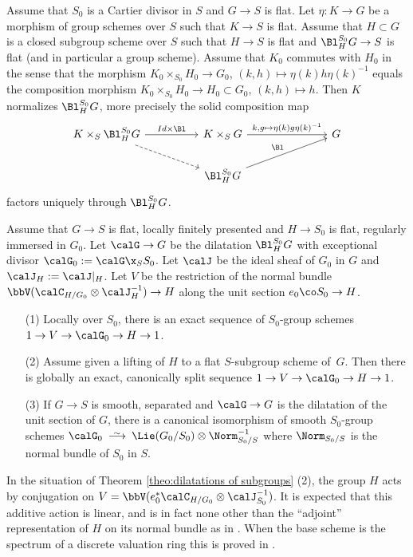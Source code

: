 \documentclass[10pt]{alggeom}
\theoremstyle{definition}
\numberwithin{equation}{section}
\newcommand*\isomto{%
  \renewcommand{\arraystretch}{0.1}
  \begin{array}[b]{c} {}_{\sim} \\ \longrightarrow \end{array}%
}
\begin{document}
\prop[\cite{Ma23d}]
Assume that $S_0$ is a Cartier divisor in $S$ and $G \to S$ is flat. Let $\eta : K\to G$ be a morphism of group schemes over $S$ such that $K \to S$ is flat. Assume that $H \subset G $ is a closed subgroup scheme over $S$ such that $H \to S$ is flat and $\Bl_H^{S_0} G \to S$ is flat (and in particular a group scheme). Assume that
 $K_0 $ commutes with $H_0$ in the sense that the morphism $K_0 \times _{S_0} H_0 \to G_0 $, $(k,h) \mapsto \eta(k)h\eta(k)^{-1} $ equals the composition morphism $K_0 \times _{S_0} H_0 \to H_0 \subset G_0$, $(k,h) \mapsto h$. Then $K$ normalizes $\Bl _H^{S_0} G$, more precisely the solid composition map \[
 \begin{tikzcd} K \times _S \Bl _{H}^{S_0} G \ar[rr, "Id \times \Bl "] \ar[rrd, dashrightarrow] & & K \times _S G \ar[rrr, "k {,} g \mapsto \eta(k)g\eta(k)^{-1} "] & & & G\\ &  &\Bl _H ^{S_0} G  \ar[rrru, "\Bl"]&  & \end{tikzcd} \]
 factors uniquely through $\Bl _H^{S_0} G $.
 \xprop
 

 
  \label{theo:dilatations of subgroups}
 Assume that 
$G\to S$ is flat, locally finitely presented and $H\to S_0$ is flat,
regularly immersed in $G_0 $. Let $\calG\to G$ be the dilatation
$\Bl_H^{S_0} G$ with exceptional divisor $\calG_0:=\calG\x_SS_0$.
Let $\calJ$ be the ideal sheaf of $G_0$ in $G$ and
$\calJ_H:=\calJ|_H$. Let $V$ be the restriction of the normal
bundle $\bbV(\calC_{H/G_0}\otimes \calJ_H^{-1})\to H$ along the
unit section $e_0\co S_0\to H$.
\begin{enumerate}
\item[(1)] Locally over $S_0$, there is an exact sequence of
$S_0$-group schemes $1 \to V \to \calG_0 \to H\to 1$.
\item[(2)] Assume given a lifting of $H$ to a flat $S$-subgroup
scheme of~$G$. Then there is globally an exact, canonically
split sequence $1 \to V \to \calG_0 \to H\to 1$.
\item[(3)] If $G\to S$ is smooth, separated and $\calG\to G$ is the
dilatation of the unit section of $G$, there is a canonical
isomorphism of smooth $S_0$-group schemes
$\calG_0 \isomto \Lie(G_0/S_0)\otimes\Norm_{S_0/S}^{-1}$
where $\Norm_{S_0/S}$ is the normal bundle of $S_0$ in $S$.
\end{enumerate}
\xtheo

\rema
In the situation of Theorem \ref{theo:dilatations of subgroups} (2),
the group $H$ acts by conjugation on
$V=\bbV(e_0^*\calC_{H/G_0}\otimes \calJ_{S_0}^{-1})$.
It is expected that this additive action is linear, and is
in fact none other than the ``adjoint'' representation of $H$ on
its normal bundle as in \cite[Exp.~I, Prop.~6.8.6]{SGA3}.
When the base scheme is the spectrum of a discrete
valuation ring this is proved in \cite[Prop.~2.7]{duong-hai-dos_santos18}. 
\xrema
 
\end{document}
